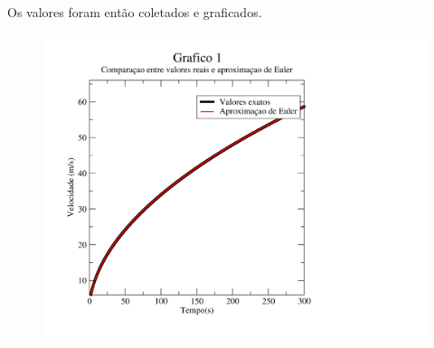 \message{ !name(relatorio.tex)}\documentclass{article}
\begin{document}
Os valores foram então coletados e graficados.

\begin{figure}[h]
  \centering
  \includegraphics[width=\textwidth]{graf1}
\end{figure}
\end{document}
